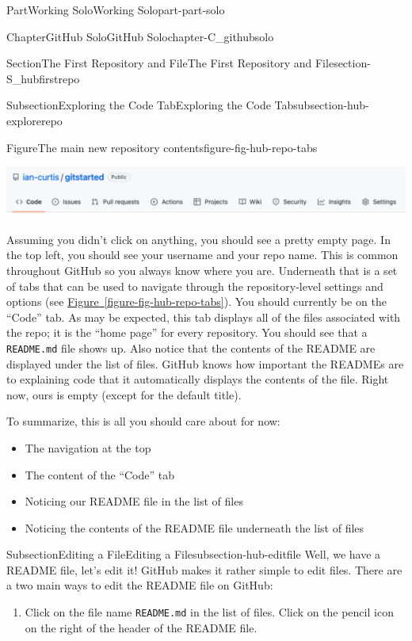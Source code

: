 \documentclass[oneside,10pt,]{book}
\newcommand{\xreffont}{\relax}
\newcommand{\mono}[1]{\texttt{#1}}
\begin{document}
\begin{partptx}{Part}{Working Solo}{}{Working Solo}{}{}{part-part-solo}
\begin{chapterptx}{Chapter}{GitHub Solo}{}{GitHub Solo}{}{}{chapter-C_githubsolo}
\begin{sectionptx}{Section}{The First Repository and File}{}{The First Repository and File}{}{}{section-S_hubfirstrepo}
\begin{subsectionptx}{Subsection}{Exploring the Code Tab}{}{Exploring the Code Tab}{}{}{subsection-hub-explorerepo}
\begin{figureptx}{Figure}{The main new repository contents}{figure-fig-hub-repo-tabs}{}
\begin{image}{0.1}{0.8}{0.1}{}%
\includegraphics[width=\linewidth]{external/hub_repo_tabs.pdf}
\end{image}%
\tcblower
\end{figureptx}%
Assuming you didn't click on anything, you should see a pretty empty page. In the top left, you should see your username and your repo name. This is common throughout GitHub so you always know where you are. Underneath that is a set of tabs that can be used to navigate through the repository-level settings and options (see \hyperref[figure-fig-hub-repo-tabs]{Figure~{\xreffont\ref{figure-fig-hub-repo-tabs}}}). You should currently be on the ``Code'' tab. As may be expected, this tab displays all of the files associated with the repo; it is the ``home page'' for every repository. You should see that a \mono{README.md} file shows up. Also notice that the contents of the README are displayed under the list of files. GitHub knows how important the READMEs are to explaining code that it automatically displays the contents of the file. Right now, ours is empty (except for the default title).%
\par
To summarize, this is all you should care about for now:%
\begin{itemize}[label=\textbullet]
\item{}The navigation at the top%
\item{}The content of the ``Code'' tab%
\item{}Noticing our README file in the list of files%
\item{}Noticing the contents of the README file underneath the list of files%
\end{itemize}
%
\end{subsectionptx}
%
%
\typeout{************************************************}
\typeout{************************************************}
%
\begin{subsectionptx}{Subsection}{Editing a File}{}{Editing a File}{}{}{subsection-hub-editfile}
%
Well, we have a README file, let's edit it! GitHub makes it rather simple to edit files. There are a two main ways to edit the README file on GitHub:%
\begin{enumerate}
\item{}Click on the file name \mono{README.md} in the list of files. Click on the pencil icon on the right of the header of the README file.%

\end{enumerate}
\end{subsectionptx}
\end{sectionptx}
\end{chapterptx}
\end{partptx}
\end{document}
